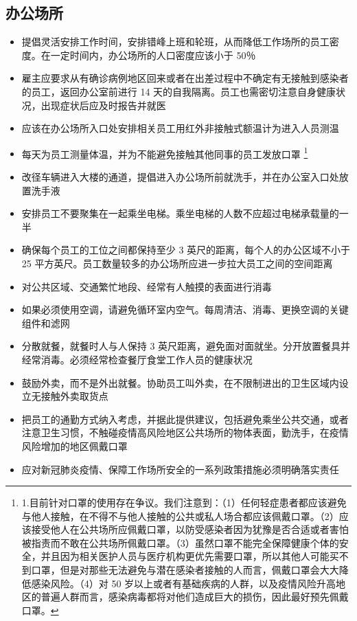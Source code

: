 \documentclass[onecolumn,journal]{IEEEtran}
\begin{document}
\begin{multicols}{2}
\section*{办公场所}
\begin{itemize}
\item 提倡灵活安排工作时间，安排错峰上班和轮班，从而降低工作场所的员工密度。在一定时间内，办公场所的人口密度应该小于 50％
\item 雇主应要求从有确诊病例地区回来或者在出差过程中不确定有无接触到感染者的员工，返回办公室前进行 14 天的自我隔离。员工也需密切注意自身健康状况，出现症状后应及时报告并就医
\item 应该在办公场所入口处安排相关员工用红外非接触式额温计为进入人员测温
\item 每天为员工测量体温，并为不能避免接触其他同事的员工发放口罩 \footnote{1.目前针对口罩的使用存在争议。我们注意到：（1）任何轻症患者都应该避免与他人接触，在不得不与他人接触的公共或私人场合都应该佩戴口罩。（2）应该接受他人在公共场所应佩戴口罩，以防受感染者因为犹豫是否合适或者害怕被指责而不敢在公共场所佩戴口罩。（3）虽然口罩不能完全保障健康个体的安全，并且因为相关医护人员与医疗机构更优先需要口罩，所以其他人可能买不到口罩，但是对那些无法避免与潜在感染者接触的人而言，佩戴口罩会大大降低感染风险。（4）对 50 岁以上或者有基础疾病的人群，以及疫情风险升高地区的普遍人群而言，感染病毒都将对他们造成巨大的损伤，因此最好预先佩戴口罩。}
\item 改径车辆进入大楼的通道，提倡进入办公场所前就洗手，并在办公室入口处放置洗手液
\item 安排员工不要聚集在一起乘坐电梯。乘坐电梯的人数不应超过电梯承载量的一半
\item 确保每个员工的工位之间都保持至少 3 英尺的距离，每个人的办公区域不小于 25 平方英尺。员工数量较多的办公场所应进一步拉大员工之间的空间距离
\item 对公共区域、交通繁忙地段、经常有人触摸的表面进行消毒
\item 如果必须使用空调，请避免循环室内空气。每周清洁、消毒、更换空调的关键组件和滤网
\item 分散就餐，就餐时人与人保持 3 英尺距离，避免面对面就坐。分开放置餐具并经常消毒。必须经常检查餐厅食堂工作人员的健康状况
\item 鼓励外卖，而不是外出就餐。协助员工叫外卖，在不限制进出的卫生区域内设立无接触外卖取货点
\item 把员工的通勤方式纳入考虑，并据此提供建议，包括避免乘坐公共交通，或者注意卫生习惯，不触碰疫情高风险地区公共场所的物体表面，勤洗手，在疫情风险增加的地区佩戴口罩
\item 应对新冠肺炎疫情、保障工作场所安全的一系列政策措施必须明确落实责任
\end{itemize}
%

\end{multicols}
\end{document}
